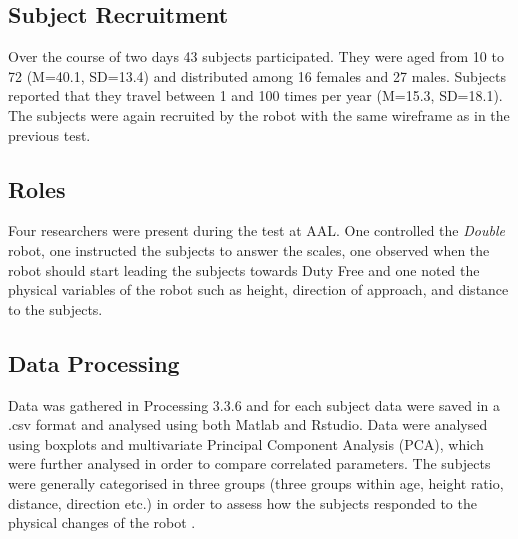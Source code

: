 \subsection{Subject Recruitment}
Over the course of two days 43 subjects participated. They were aged from 10 to 72 (M=40.1, SD=13.4) and distributed among 16 females and 27 males. Subjects reported that they travel between 1 and 100 times per year (M=15.3, SD=18.1). The subjects were again recruited by the robot with the same wireframe as in the previous test.

\subsection{Roles}
Four researchers were present during the test at AAL. One controlled the \textit{Double} robot, one instructed the subjects to answer the scales, one observed when the robot should start leading the subjects towards Duty Free and one noted the physical variables of the robot such as height, direction of approach, and distance to the subjects.

\subsection{Data Processing}
Data was gathered in Processing 3.3.6 and for each subject data were saved in a .csv format and analysed using both Matlab and Rstudio. Data were analysed using boxplots and multivariate Principal Component Analysis (PCA), which were further analysed in order to compare correlated parameters. The subjects were generally categorised in three groups (three groups within age, height ratio, distance, direction etc.) in order to assess how the subjects responded to the physical changes of the robot .
